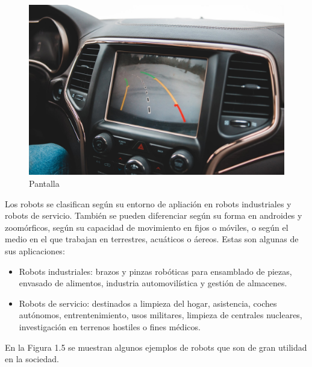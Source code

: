 \begin{figure}[H]
\begin{minipage}[b]{0.5\linewidth}
  \end{minipage}%
  \begin{minipage}[b]{0.5\linewidth}
    \centering
    \includegraphics[width=.65\linewidth]{chapters/images/pantalla.jpeg} 
    \caption{Pantalla} 
  \end{minipage} 
\end{figure}

Los robots se clasifican según su entorno de apliación en robots industriales y robots de servicio. También se pueden diferenciar según su forma en androides y zoomórficos, según su capacidad de movimiento en fijos o móviles, o según el medio en el que trabajan en terrestres, acuáticos o áereos. Estas son algunas de sus aplicaciones:
\begin{itemize}
    \item Robots industriales: brazos y pinzas robóticas para ensamblado de piezas, envasado de alimentos, industria automovilística y gestión de almacenes.
    \item Robots de servicio: destinados a limpieza del hogar, asistencia, coches autónomos, entrentenimiento, usos militares, limpieza de centrales nucleares, investigación en terrenos hostiles o fines médicos.
\end{itemize} 

 En la Figura 1.5 se muestran algunos ejemplos de robots que son de gran utilidad en la sociedad. 

